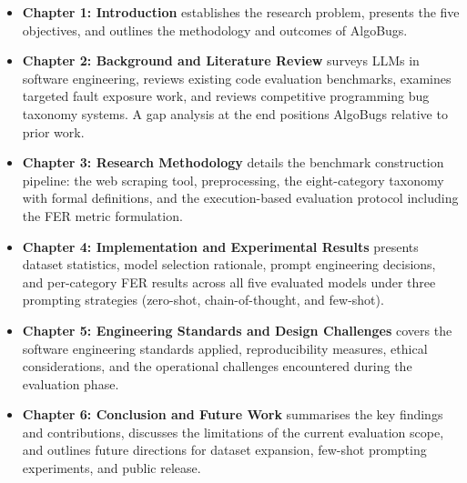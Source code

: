 \begin{itemize}
    \item \textbf{Chapter 1: Introduction} establishes the research problem, presents the five objectives, and outlines the methodology and outcomes of AlgoBugs.

    \item \textbf{Chapter 2: Background and Literature Review} surveys LLMs in software engineering, reviews existing code evaluation benchmarks, examines targeted fault exposure work, and reviews competitive programming bug taxonomy systems. A gap analysis at the end positions AlgoBugs relative to prior work.

    \item \textbf{Chapter 3: Research Methodology} details the benchmark construction pipeline: the web scraping tool, preprocessing, the eight-category taxonomy with formal definitions, and the execution-based evaluation protocol including the FER metric formulation.

    \item \textbf{Chapter 4: Implementation and Experimental Results} presents dataset statistics, model selection rationale, prompt engineering decisions, and per-category FER results across all five evaluated models under three prompting strategies (zero-shot, chain-of-thought, and few-shot).

    \item \textbf{Chapter 5: Engineering Standards and Design Challenges} covers the software engineering standards applied, reproducibility measures, ethical considerations, and the operational challenges encountered during the evaluation phase.

    \item \textbf{Chapter 6: Conclusion and Future Work} summarises the key findings and contributions, discusses the limitations of the current evaluation scope, and outlines future directions for dataset expansion, few-shot prompting experiments, and public release.
\end{itemize}
